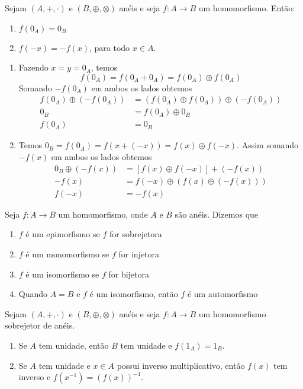 \begin{proposicao}
	Sejam $(A, +, \cdot)$ e $(B, \oplus, \otimes)$ anéis e seja $f : A \to B$ um homomorfismo. Ent{\~a}o:
	\begin{enumerate}[label={\roman*})]
		\item $f(0_{A}) = 0_{B}$
		\item $f(-x) = -f(x)$, para todo $x \in A$.
	\end{enumerate}
\end{proposicao}
\begin{prova}
	\begin{enumerate}[label={\roman*})]
		\item Fazendo $x = y = 0_{A}$, temos
		\[
			f(0_A) = f(0_A + 0_A) = f(0_A) \oplus f(0_A)
		\]
		Somando $-f(0_A)$ em ambos os lados obtemos
		\begin{align*}
			f(0_A) \oplus (-f(0_A)) &= (f(0_A)\oplus f(0_A)) \oplus (-f(0_A))\\
			0_B &= f(0_A) \oplus 0_B\\
			f(0_A) &= 0_B
		\end{align*}

		\item Temos $0_B = f(0_A) = f(x + (-x)) = f(x)\oplus f(-x)$. Assim somando $-f(x)$ em ambos os lados obtemos
		\begin{align*}
			0_B\oplus(-f(x)) &= [f(x)\oplus f(-x)] + (-f(x))\\
			-f(x) &= f(-x) \oplus (f(x) \oplus (-f(x)))\\
			f(-x) &= -f(x)
		\end{align*}
	\end{enumerate}
\end{prova}

\begin{definicao}Seja $f:A\rightarrow B$ um homomorfismo, onde $A$ e $B$ s{\~a}o an{\'e}is. Dizemos que
	\begin{enumerate}[label={\roman*})]
		\item $f$ {\'e} um epimorfismo se $f$ for sobrejetora
		\item $f$ {\'e} um monomorfismo se $f$ for injetora
		\item $f$ {\'e} um isomorfismo se $f$ for bijetora
		\item Quando $A=B$ e $f$ {\'e} um isomorfismo, ent{\~a}o $f$ {\'e} um automorfismo
	\end{enumerate}
\end{definicao}

\begin{proposicao}
	Sejam $(A, +, \cdot)$ e $(B, \oplus, \otimes)$ anéis e seja $f : A \to B$ um homomorfismo sobrejetor de an\'eis.
	\begin{enumerate}[label={\roman*})]
		\item Se $A$ tem unidade, então $B$ tem unidade e $f(1_A) = 1_B$.
		\item Se $A$ tem unidade e $x \in A$ possui inverso multiplicativo, então $f(x)$ tem inverso e $f(x^{-1}) = (f(x))^{-1}$.
	\end{enumerate}
\end{proposicao}

